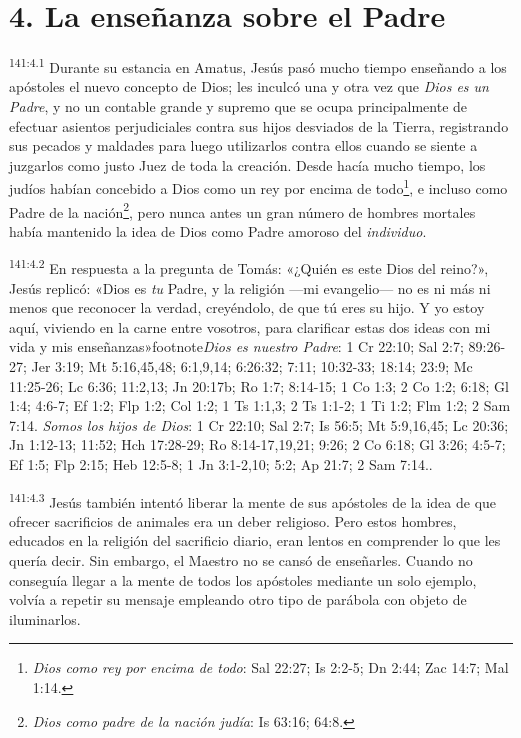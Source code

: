 \section*{4. La enseñanza sobre el Padre}
\par
\textsuperscript{141:4.1} Durante su estancia en Amatus, Jesús pasó mucho tiempo enseñando a los apóstoles el nuevo concepto de Dios; les inculcó una y otra vez que \textit{Dios es un Padre}, y no un contable grande y supremo que se ocupa principalmente de efectuar asientos perjudiciales contra sus hijos desviados de la Tierra, registrando sus pecados y maldades para luego utilizarlos contra ellos cuando se siente a juzgarlos como justo Juez de toda la creación. Desde hacía mucho tiempo, los judíos habían concebido a Dios como un rey por encima de todo\footnote{\textit{Dios como rey por encima de todo}: Sal 22:27; Is 2:2-5; Dn 2:44; Zac 14:7; Mal 1:14.}, e incluso como Padre de la nación\footnote{\textit{Dios como padre de la nación judía}: Is 63:16; 64:8.}, pero nunca antes un gran número de hombres mortales había mantenido la idea de Dios como Padre amoroso del \textit{individuo}.

\par
\textsuperscript{141:4.2} En respuesta a la pregunta de Tomás: «¿Quién es este Dios del reino?», Jesús replicó: «Dios es \textit{tu} Padre, y la religión ---mi evangelio--- no es ni más ni menos que reconocer la verdad, creyéndolo, de que tú eres su hijo. Y yo estoy aquí, viviendo en la carne entre vosotros, para clarificar estas dos ideas con mi vida y mis enseñanzas»footnote{\textit{Dios es nuestro Padre}: 1 Cr 22:10; Sal 2:7; 89:26-27; Jer 3:19; Mt 5:16,45,48; 6:1,9,14; 6:26:32; 7:11; 10:32-33; 18:14; 23:9; Mc 11:25-26; Lc 6:36; 11:2,13; Jn 20:17b; Ro 1:7; 8:14-15; 1 Co 1:3; 2 Co 1:2; 6:18; Gl 1:4; 4:6-7; Ef 1:2; Flp 1:2; Col 1:2; 1 Ts 1:1,3; 2 Ts 1:1-2; 1 Ti 1:2; Flm 1:2; 2 Sam 7:14. \textit{Somos los hijos de Dios}: 1 Cr 22:10; Sal 2:7; Is 56:5; Mt 5:9,16,45; Lc 20:36; Jn 1:12-13; 11:52; Hch 17:28-29; Ro 8:14-17,19,21; 9:26; 2 Co 6:18; Gl 3:26; 4:5-7; Ef 1:5; Flp 2:15; Heb 12:5-8; 1 Jn 3:1-2,10; 5:2; Ap 21:7; 2 Sam 7:14.}.

\par
\textsuperscript{141:4.3} Jesús también intentó liberar la mente de sus apóstoles de la idea de que ofrecer sacrificios de animales era un deber religioso. Pero estos hombres, educados en la religión del sacrificio diario, eran lentos en comprender lo que les quería decir. Sin embargo, el Maestro no se cansó de enseñarles. Cuando no conseguía llegar a la mente de todos los apóstoles mediante un solo ejemplo, volvía a repetir su mensaje empleando otro tipo de parábola con objeto de iluminarlos.

